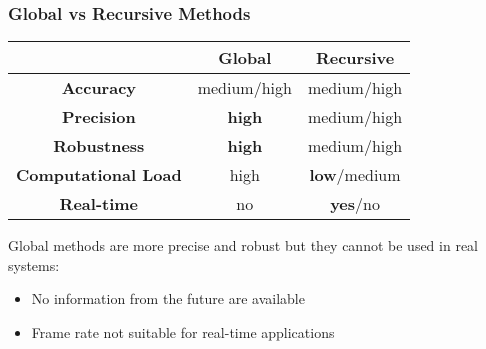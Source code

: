 \begin{frame}
	\frametitle{Global vs Recursive Methods}
	
	\Large
	
	\vspace{0.1cm}
	
	\begin{table}[!t]
		\centering
		\begin{tabular}{ c | c | c | }
			\cline{2-3}
			& \textbf{Global} & \textbf{Recursive} \\ \hline
			
			\multicolumn{1}{|c|}{\textbf{Accuracy}} & medium/high & medium/high \\ \hline
			\multicolumn{1}{|c|}{\textbf{Precision}} & \textbf{high} & medium/high \\ \hline
			\multicolumn{1}{|c|}{\textbf{Robustness}} & \textbf{high} & medium/high \\ \hline
			\multicolumn{1}{|c|}{\textbf{Computational Load}} & high & \textbf{low}/medium \\ \hline
			\multicolumn{1}{|c|}{\textbf{Real-time}} & no & \textbf{yes}/no \\ \hline
		\end{tabular}
	\end{table}
	
	\vspace{0.15cm}
	
	Global methods are more precise and robust but they cannot be used in real systems:
	\begin{itemize}
		\item No information from the future are available
		\vspace{-0.1cm}
		\item Frame rate not suitable for real-time applications
	\end{itemize}
\end{frame}
